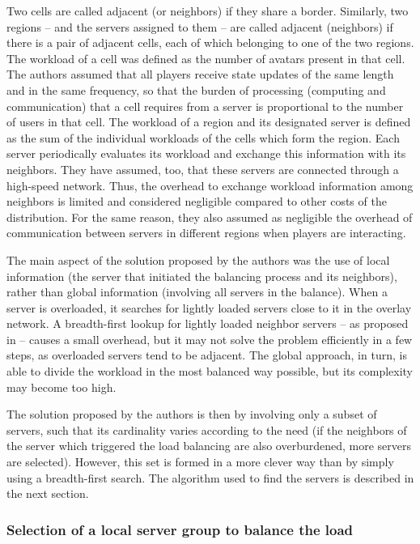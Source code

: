 Two cells are called adjacent (or neighbors) if they share a border. Similarly, two regions -- and the servers assigned to them -- are called adjacent (neighbors) if there is a pair of adjacent cells, each of which belonging to one of the two regions. The workload of a cell was defined as the number of avatars present in that cell. The authors assumed that all players receive state updates of the same length and in the same frequency, so that the burden of processing (computing and communication) that a cell requires from a server is proportional to the number of users in that cell. The workload of a region and its designated server is defined as the sum of the individual workloads of the cells which form the region. Each server periodically evaluates its workload and exchange this information with its neighbors. They have assumed, too, that these servers are connected through a high-speed network. Thus, the overhead to exchange workload information among neighbors is limited and considered negligible compared to other costs of the distribution. For the same reason, they also assumed as negligible the overhead of communication between servers in different regions when players are interacting.

The main aspect of the solution proposed by the authors was the use of local information (the server that initiated the balancing process and its neighbors), rather than global information (involving all servers in the balance). When a server is overloaded, it searches for lightly loaded servers close to it in the overlay network. A breadth-first lookup for lightly loaded neighbor servers -- as proposed in \cite{duong2003dls} -- causes a small overhead, but it may not solve the problem efficiently in a few steps, as overloaded servers tend to be adjacent. The global approach, in turn, is able to divide the workload in the most balanced way possible, but its complexity may become too high.

The solution proposed by the authors is then by involving only a subset of servers, such that its cardinality varies according to the need (if the neighbors of the server which triggered the load balancing are also overburdened, more servers are selected). However, this set is formed in a more clever way than by simply using a breadth-first search. The algorithm used to find the servers is described in the next section.

\subsubsection{Selection of a local server group to balance the load}
\label{sec:regselect}
	
